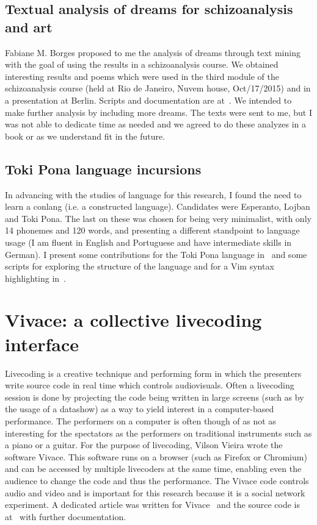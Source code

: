\begin{apendicesenv}
\subsection{Textual analysis of dreams for schizoanalysis and art}
Fabiane M. Borges proposed to me the analysis of dreams through text mining
with the goal of using the results in a schizoanalysis course.
We obtained interesting results and poems which were used in
the third module of the schizoanalysis course (held at Rio de Janeiro,
Nuvem house, Oct/17/2015) and in a presentation at Berlin.
Scripts and documentation are at~\cite{sonhos}.
We intended to make further analysis by including more dreams.
The texts were sent to me, but I was not able to dedicate time
as needed and we agreed to do these analyzes in a book or
as we understand fit in the future.

\subsection{Toki Pona language incursions}
In advancing with the studies of language for this research,
I found the need to learn a conlang (i.e. a constructed language).
Candidates were Esperanto, Lojban and Toki Pona.
The last on these was chosen for being very minimalist,
with only 14 phonemes and 120 words,
and presenting a different standpoint to language usage
(I am fluent in English and Portuguese and have intermediate skills in German).
I present some contributions for the Toki Pona language in~\cite{tokiio}
and some scripts for exploring the structure of the language and for
a Vim syntax highlighting in~\cite{tokir}.

\section{Vivace: a collective livecoding interface}\label{sec:vivace}
Livecoding is a creative technique and performing form in which the
presenters write source code in real time which controls audiovisuals.
Often a livecoding session is done by projecting the code being written in
large screens (such as by the usage of a datashow) as a way to yield
interest in a computer-based performance.
The performers on a computer is often though of as not as interesting
for the spectators as the performers on traditional instruments such as a piano or a guitar.
For the purpose of livecoding, Vilson Vieira wrote the software Vivace.
This software runs on a browser (such as Firefox or Chromium)
and can be accessed by multiple livecoders at the same time,
enabling even the audience to change the code and thus the performance.
The Vivace code controls audio and video and is important for
this research because it is a social network experiment.
A dedicated article was written for Vivace~\cite{vivacecmj}
and the source code is at~\cite{vivacecode} with further documentation.


\end{apendicesenv}
